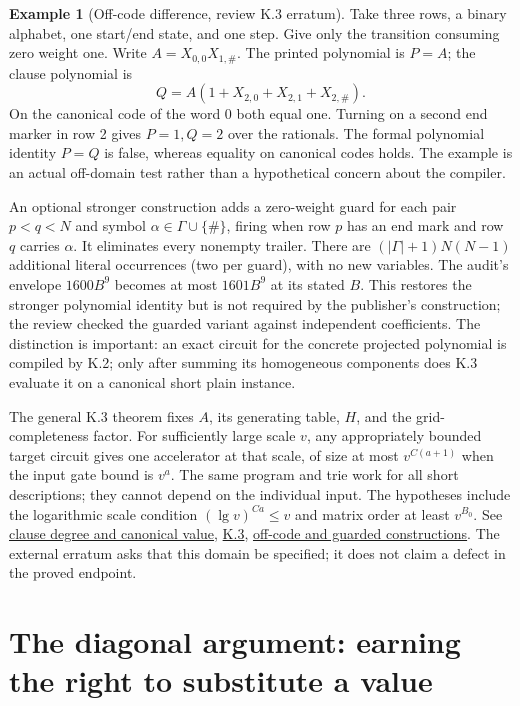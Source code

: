 \documentclass[11pt,letterpaper]{article}
\theoremstyle{definition}\newtheorem{definition}[theorem]{Definition}\newtheorem{example}[theorem]{Example}
\theoremstyle{remark}\newtheorem{remark}[theorem]{Remark}
\newcommand{\pub}[3]{\href{https://github.com/anthropics/formal-math/blob/11b6c7e3c927df2658f513b6b68ea7f8929c62c5/vp-vnp/#1\#L#2}{#3}}
\newcommand{\aud}[2]{\href{https://github.com/nousentllc/VP-VNP-Review/blob/567303d0bcf4f9d54390437b137752446e58ccd6/#1}{#2}}
\begin{document}
\begin{example}[Off-code difference, review K.3 erratum]\label{ex:k3}
Take three rows, a binary alphabet, one start/end state, and one step. Give only the transition consuming zero weight one. Write $A=X_{0,0}X_{1,\#}$. The printed polynomial is $P=A$; the clause polynomial is
\[
 Q=A(1+X_{2,0}+X_{2,1}+X_{2,\#}).
\]
On the canonical code of the word 0 both equal one. Turning on a second end marker in row 2 gives $P=1,Q=2$ over the rationals. The formal polynomial identity $P=Q$ is false, whereas equality on canonical codes holds. The example is an actual off-domain test rather than a hypothetical concern about the compiler.
\end{example}
An optional stronger construction adds a zero-weight guard for each pair $p<q<N$ and symbol $\alpha\in\Gamma\cup\{\#\}$, firing when row $p$ has an end mark and row $q$ carries $\alpha$. It eliminates every nonempty trailer. There are $(|\Gamma|+1)N(N-1)$ additional literal occurrences (two per guard), with no new variables. The audit's envelope $1600B^9$ becomes at most $1601B^9$ at its stated $B$. This restores the stronger polynomial identity but is not required by the publisher's construction; the review checked the guarded variant against independent coefficients. The distinction is important: an exact circuit for the concrete projected polynomial is compiled by K.2; only after summing its homogeneous components does K.3 evaluate it on a canonical short plain instance.

The general K.3 theorem fixes $A$, its generating table, $H$, and the grid-completeness factor. For sufficiently large scale $v$, any appropriately bounded target circuit gives one accelerator at that scale, of size at most $v^{C(a+1)}$ when the input gate bound is $v^a$. The same program and trie work for all short descriptions; they cannot depend on the individual input. The hypotheses include the logarithmic scale condition $(\lg v)^{Ca}\le v$ and matrix order at least $v^{B_0}$. See \pub{Paper/CircuitPhi.lean}{175}{clause degree and canonical value}, \pub{Paper/Circuit.lean}{294}{K.3}, \aud{passes/14c-compiler.md}{off-code and guarded constructions}. The external erratum asks that this domain be specified; it does not claim a defect in the proved endpoint.

\section{The diagonal argument: earning the right to substitute a value}\label{sec:diagonal}
\end{document}
